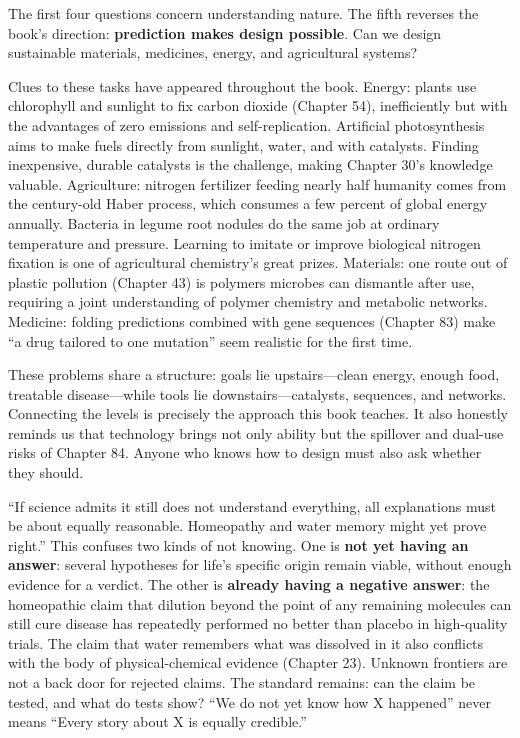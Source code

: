 The first four questions concern understanding nature. The fifth reverses the book's direction: \textbf{prediction makes design possible}. Can we design sustainable materials, medicines, energy, and agricultural systems?

Clues to these tasks have appeared throughout the book. Energy: plants use chlorophyll and sunlight to fix carbon dioxide (Chapter 54), inefficiently but with the advantages of zero emissions and self-replication. Artificial photosynthesis aims to make fuels directly from sunlight, water, and  with catalysts. Finding inexpensive, durable catalysts is the challenge, making Chapter 30's knowledge valuable. Agriculture: nitrogen fertilizer feeding nearly half humanity comes from the century-old Haber process, which consumes a few percent of global energy annually. Bacteria in legume root nodules do the same job at ordinary temperature and pressure. Learning to imitate or improve biological nitrogen fixation is one of agricultural chemistry's great prizes. Materials: one route out of plastic pollution (Chapter 43) is polymers microbes can dismantle after use, requiring a joint understanding of polymer chemistry and metabolic networks. Medicine: folding predictions combined with gene sequences (Chapter 83) make ``a drug tailored to one mutation'' seem realistic for the first time.

These problems share a structure: goals lie upstairs---clean energy, enough food, treatable disease---while tools lie downstairs---catalysts, sequences, and networks. Connecting the levels is precisely the approach this book teaches. It also honestly reminds us that technology brings not only ability but the spillover and dual-use risks of Chapter 84. Anyone who knows how to design must also ask whether they should.

\begin{wuqu}
``If science admits it still does not understand everything, all explanations must be about equally reasonable. Homeopathy and water memory might yet prove right.'' This confuses two kinds of not knowing. One is \textbf{not yet having an answer}: several hypotheses for life's specific origin remain viable, without enough evidence for a verdict. The other is \textbf{already having a negative answer}: the homeopathic claim that dilution beyond the point of any remaining molecules can still cure disease has repeatedly performed no better than placebo in high-quality trials. The claim that water remembers what was dissolved in it also conflicts with the body of physical-chemical evidence (Chapter 23). Unknown frontiers are not a back door for rejected claims. The standard remains: can the claim be tested, and what do tests show? ``We do not yet know how X happened'' never means ``Every story about X is equally credible.''
\end{wuqu}

